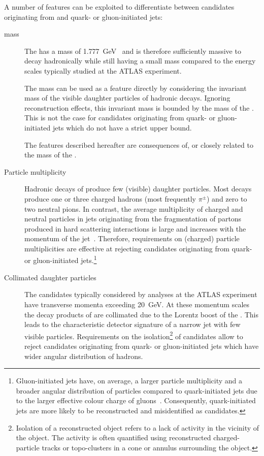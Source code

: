 A number of features can be exploited to differentiate between
\tauhadvis candidates originating from \tauhad and quark- or
gluon-initiated jets:
\begin{description}

\item[\taulepton mass] The \taulepton has a mass of
  \SI{1.777}{\GeV}~\cite{pdg2020} and is therefore sufficiently massive to decay
  hadronically while still having a small mass compared to the energy scales
  typically studied at the ATLAS experiment.

  The \taulepton mass can be used as a feature directly by considering the
  invariant mass of the visible daughter particles of hadronic \taulepton
  decays. Ignoring reconstruction effects, this invariant mass is bounded by the
  mass of the \taulepton. This is not the case for \tauhadvis candidates
  originating from quark- or gluon-initiated jets which do not have a strict
  upper bound.

  The features described hereafter are consequences of, or closely
  related to the mass of the \taulepton.

\item[Particle multiplicity] Hadronic decays of \tauleptons produce
  few (visible) daughter particles. Most decays produce one or three
  charged hadrons (most frequently $\pi^{\pm}$) and zero to two
  neutral pions.
  In contrast, the average multiplicity of charged and neutral
  particles in jets originating from the fragmentation of partons
  produced in hard scattering interactions is large and increases with
  the momentum of the
  jet~\cite{Ellis:1996mzs,STDM-2015-12}. Therefore, requirements on
  (charged) particle multiplicities are effective at rejecting
  \tauhadvis candidates originating from quark- or gluon-initiated
  jets.\footnote{Gluon-initiated jets have, on average, a larger
    particle multiplicity and a broader angular distribution of
    particles compared to quark-initiated jets due to the larger
    effective colour charge of
    gluons~\cite{Ellis:1996mzs}. Consequently, quark-initiated jets
    are more likely to be reconstructed and misidentified as
    \tauhadvis candidates.}

\item[Collimated daughter particles] The \tauhadvis candidates typically
  considered by analyses at the ATLAS experiment have transverse momenta
  exceeding \SI{20}{\GeV}. At these momentum scales the decay products of
  \tauleptons are collimated due to the Lorentz boost of the \taulepton. This
  leads to the characteristic detector signature of a narrow jet with few
  visible particles. Requirements on the isolation\footnote{Isolation of a
    reconstructed object refers to a lack of activity in the vicinity of the
    object. The activity is often quantified using reconstructed
    charged-particle tracks or topo-clusters in a cone or annulus surrounding
    the object.} of \tauhadvis candidates allow to reject candidates originating
  from quark- or gluon-initiated jets which have wider angular distribution of
  hadrons.


\end{description}
